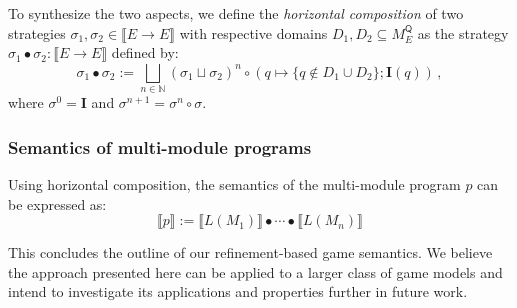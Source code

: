 \documentclass[format=sigplan,authordraft]{acmart}
\newcommand{\kw}[1]{\ensuremath{\mathsf{#1}}}
\begin{document}
To synthesize the two aspects,
we define the \emph{horizontal composition}
of two strategies $\sigma_1, \sigma_2 \in \llbracket E \rightarrow E \rrbracket$
with respective domains $D_1, D_2 \subseteq M_E^\kw{Q}$
as the strategy $\sigma_1 \bullet \sigma_2 : \llbracket E \rightarrow E
\rrbracket$ defined by:
\[
    \sigma_1 \bullet \sigma_2 :=
      \bigsqcup_{n \in \mathbb{N}} (\sigma_1 \sqcup \sigma_2)^n \circ
        (q \mapsto \{ q \notin D_1 \cup D_2 \} ; \mathbf{I}(q))
 \,,
\]
where $\sigma^0 = \mathbf{I}$ and $\sigma^{n+1} = \sigma^n \circ
\sigma$.

\subsubsection{Semantics of multi-module programs}

Using horizontal composition,
the semantics of the multi-module program $p$
can be expressed as:
\[
    \llbracket p \rrbracket :=
    \llbracket L(M_1) \rrbracket \bullet \cdots \bullet
    \llbracket L(M_n) \rrbracket
\]

This concludes the outline of our refinement-based game semantics.
We believe the approach presented here can be applied to a larger class
of game models and intend to investigate its applications
and properties further in future work.

\end{document}
